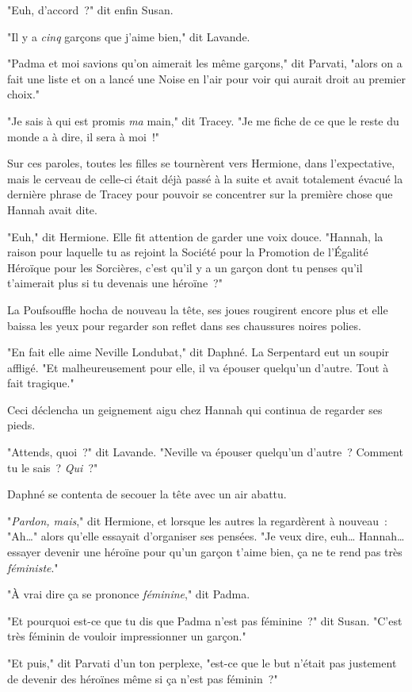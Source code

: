 "Euh, d'accord~?" dit enfin Susan.

"Il y a \emph{cinq} garçons que j'aime bien," dit Lavande.

"Padma et moi savions qu'on aimerait les même garçons," dit Parvati, "alors on a fait une liste et on a lancé une Noise en l'air pour voir qui aurait droit au premier choix."

"Je sais à qui est promis \emph{ma} main," dit Tracey. "Je me fiche de ce que le reste du monde a à dire, il sera à moi~!"

Sur ces paroles, toutes les filles se tournèrent vers Hermione, dans l'expectative, mais le cerveau de celle-ci était déjà passé à la suite et avait totalement évacué la dernière phrase de Tracey pour pouvoir se concentrer sur la première chose que Hannah avait dite.

"Euh," dit Hermione. Elle fit attention de garder une voix douce. "Hannah, la raison pour laquelle tu as rejoint la Société pour la Promotion de l'Égalité Héroïque pour les Sorcières, c'est qu'il y a un garçon dont tu penses qu'il t'aimerait plus si tu devenais une héroïne~?"

La Poufsouffle hocha de nouveau la tête, ses joues rougirent encore plus et elle baissa les yeux pour regarder son reflet dans ses chaussures noires polies.

"En fait elle aime Neville Londubat," dit Daphné. La Serpentard eut un soupir affligé. "Et malheureusement pour elle, il va épouser quelqu'un d'autre. Tout à fait tragique."

Ceci déclencha un geignement aigu chez Hannah qui continua de regarder ses pieds.

"Attends, quoi~?" dit Lavande. "Neville va épouser quelqu'un d'autre~? Comment tu le sais~? \emph{Qui}~?"

Daphné se contenta de secouer la tête avec un air abattu.

"\emph{Pardon, mais}," dit Hermione, et lorsque les autres la regardèrent à nouveau~: "Ah…" alors qu'elle essayait d'organiser ses pensées. "Je veux dire, euh… Hannah… essayer devenir une héroïne pour qu'un garçon t'aime bien, ça ne te rend pas très \emph{féministe}."

"À vrai dire ça se prononce \emph{féminine}," dit Padma.

"Et pourquoi est-ce que tu dis que Padma n'est pas féminine~?" dit Susan. "C'est très féminin de vouloir impressionner un garçon."

"Et puis," dit Parvati d'un ton perplexe, "est-ce que le but n'était pas justement de devenir des héroïnes même si ça n'est pas féminin~?"

